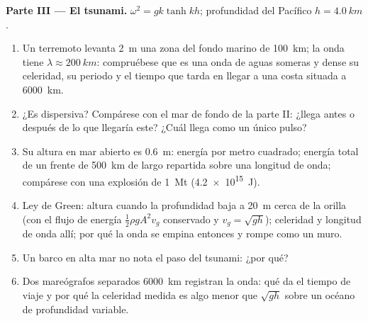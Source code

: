 \begin{problem}
\medskip
\noindent\textbf{Parte III --- El tsunami.}
$\omega^2 = gk\tanh kh$; profundidad del Pacífico $h = \qty{4.0}{km}$.
\begin{enumerate}[resume]
  \item Un terremoto levanta \qty{2}{m} una zona del fondo marino de
        \qty{100}{km}; la onda tiene $\lambda \approx \qty{200}{km}$: compruébese
        que es una onda de aguas someras y dense su celeridad, su periodo
        y el tiempo que tarda en llegar a una costa situada a \qty{6000}{km}.
  \item ¿Es dispersiva? Compárese con el mar de fondo de la parte II:
        ¿llega antes o después de lo que llegaría este? ¿Cuál llega como
        un único pulso?
  \item Su altura en mar abierto es \qty{0.6}{m}: energía por metro
        cuadrado; energía total de un frente de \qty{500}{km} de largo
        repartida sobre una longitud de onda; compárese con una explosión
        de \qty{1}{Mt} (\qty{4.2e15}{J}).
  \item Ley de Green: altura cuando la profundidad baja a \qty{20}{m} cerca
        de la orilla (con el flujo de energía $\tfrac12\rho gA^2v_g$ conservado y $v_g = \sqrt{gh}$);
        celeridad y longitud de onda allí; por qué la onda se empina
        entonces y rompe como un muro.
  \item Un barco en alta mar no nota el paso del tsunami: ¿por qué?
  \item Dos mareógrafos separados \qty{6000}{km} registran la onda: qué da
        el tiempo de viaje y por qué la celeridad medida es algo menor
        que $\sqrt{gh}$ sobre un océano de profundidad variable.
\end{enumerate}


\end{problem}
